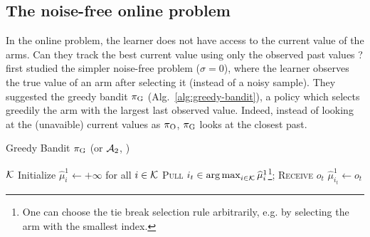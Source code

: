 \subsection{The noise-free online problem \citep{heidari2016tight}}
In the online problem, the learner does not have access to the current value of the arms. Can they track the best current value using only the observed past values ?  \citet{heidari2016tight} first studied the simpler noise-free problem ($\sigma =0$), where the learner observes the true value of an arm after selecting it (instead of a noisy sample). They suggested the greedy bandit $\pi_{\rm G}$ (Alg.~\ref{alg:greedy-bandit}), a policy which selects greedily the arm with the largest last observed value. Indeed, instead of looking at the (unavaible) current values as $\pi_{\rm O}$, $\pi_{\rm G}$ looks at the closest past. 

\begin{minipage}{\textwidth}
\renewcommand*\footnoterule{}
\begin{savenotes}
\begin{algorithm}[H]
\caption{Greedy Bandit $\pi_{\rm G}$ (or $\mathcal{A}_{\rm 2}$, \citet{heidari2016tight})}
\label{alg:greedy-bandit}
\begin{algorithmic}[1]
\Require $\mathcal{K}$
\State Initialize $\hat{\mu}_{i}^1 \leftarrow + \infty$ for all $i \in \mathcal{K}$
		\State \textsc{Pull} $i_t \in \operatorname*{arg\,max}_{i \in \mathcal{K}} \widehat{\mu}_{i}^1$\footnote{One can choose the tie break selection rule arbitrarily, e.g. by selecting the arm with the smallest index.}; \textsc{Receive} $o_{t}$
		\State $\hat{\mu}_{i_t}^1 \leftarrow o_{t}$
	\EndFor
\end{algorithmic}
\end{algorithm}
\end{savenotes}
\end{minipage}


